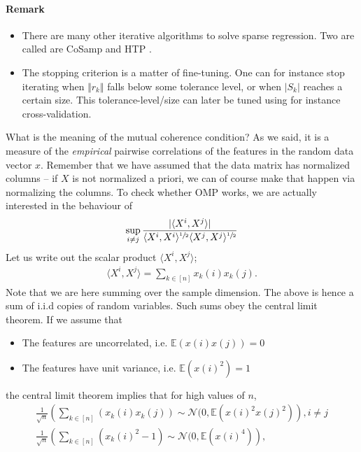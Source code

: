 \documentclass{article}
\newcommand{\sprod}[1]{\langle #1 \rangle}
\newcommand{\abs}[1]{\vert #1 \vert}
\newcommand{\norm}[1]{\Vert #1 \Vert}
\begin{document}
\paragraph{Remark}
\begin{itemize}
     \item There are many other iterative algorithms to solve sparse regression. Two are called are CoSamp \cite{needell2010cosamp} and HTP \cite{foucart2011hard}.
    \item The stopping criterion is a matter of fine-tuning. One can for instance stop iterating when $\norm{r_k}$ falls below some tolerance level, or when $\abs{S_k}$ reaches a certain size. This tolerance-level/size can later be tuned using for instance cross-validation.
\end{itemize}


What  is the meaning of the mutual coherence condition? As we said, it is a measure of the \emph{empirical} pairwise correlations of the features in the random data vector $x$. Remember that we have assumed that the data matrix has normalized columns --  if $X$ is not normalized a priori, we can of course make that happen via normalizing the columns. To check whether OMP works, we are actually interested in the behaviour of
\begin{align*}
    \sup_{i \neq j}  \frac{\abs{\sprod{X^i,X^j}}}{\sprod{X^i,X^i}^{\sfrac{1}{2}}\sprod{X^j,X^j}^{\sfrac{1}{2}}}
\end{align*}
Let us write out the scalar product $\sprod{X^i,X^j}$;
\begin{align*}
    \sprod{X^i,X^j} = \sum_{k \in [n]} x_k(i)x_k(j).
\end{align*}
Note that we are here summing over the sample dimension. The above is hence a sum of i.i.d copies of random variables.
Such sums obey the central limit theorem. If we assume that 
\begin{itemize}
    \item The features are uncorrelated, i.e. $\mathbb{E}(x(i)x(j))=0$
    \item The features have unit variance, i.e. $\mathbb{E}(x(i)^2)=1$
\end{itemize}
the central limit theorem implies that for high values of $n$,
\begin{align*}
    \frac{1}{\sqrt{n}} \left(\sum_{k \in [n]}\left(x_k(i)x_k(j)\right) \sim \mathcal{N}(0,\mathbb{E}(x(i)^2x(j)^2)\right), i \neq j \\
    \frac{1}{\sqrt{n}} \left(\sum_{k \in [n]}\left(x_k(i)^2- 1\right) \sim \mathcal{N}(0,\mathbb{E}(x(i)^4)\right),
\end{align*}
\end{document}
